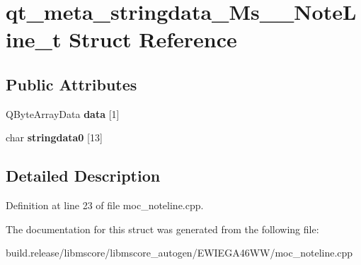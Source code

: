 \hypertarget{structqt__meta__stringdata___ms_____note_line__t}{}\section{qt\+\_\+meta\+\_\+stringdata\+\_\+\+Ms\+\_\+\+\_\+\+Note\+Line\+\_\+t Struct Reference}
\label{structqt__meta__stringdata___ms_____note_line__t}
\subsection*{Public Attributes}
\begin{DoxyCompactItemize}
\item 
\mbox{\label{structqt__meta__stringdata___ms_____note_line__t_a4f4ed50a7e0f5404da28f4f32f05234f}} 
Q\+Byte\+Array\+Data {\bfseries data} \mbox{[}1\mbox{]}
\item 
\mbox{\label{structqt__meta__stringdata___ms_____note_line__t_a61cefe68ea7bdfc43d45dc962a783ea2}} 
char {\bfseries stringdata0} \mbox{[}13\mbox{]}
\end{DoxyCompactItemize}


\subsection{Detailed Description}


Definition at line 23 of file moc\+\_\+noteline.\+cpp.



The documentation for this struct was generated from the following file\+:\begin{DoxyCompactItemize}
\item 
build.\+release/libmscore/libmscore\+\_\+autogen/\+E\+W\+I\+E\+G\+A46\+W\+W/moc\+\_\+noteline.\+cpp\end{DoxyCompactItemize}
